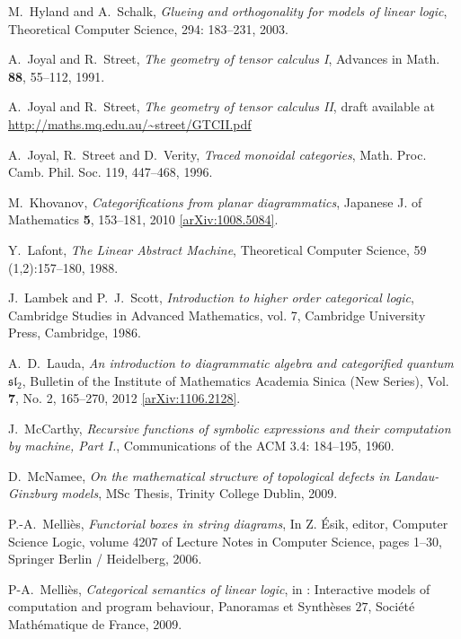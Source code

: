 \documentclass[english,letter paper,12pt,reqno]{article}
\theoremstyle{example}
\numberwithin{equation}{section}
\begin{document}
\begin{thebibliography}{BHLS03}
M.~Hyland and A.~Schalk, \textsl{Glueing and orthogonality for models of linear logic}, Theoretical Computer Science, 294: 183--231, 2003.

A.~Joyal and R.~Street, \textsl{The geometry of tensor calculus I}, Advances in Math. \textbf{88}, 55--112, 1991.

A.~Joyal and R.~Street, \textsl{The geometry of tensor calculus II}, 
draft available at 
\href{http://maths.mq.edu.au/~street/GTCII.pdf}{http://maths.mq.edu.au/\textasciitilde street/GTCII.pdf}

A.~Joyal, R.~Street and D.~Verity, \textsl{Traced monoidal categories}, Math. Proc. Camb. Phil. Soc. 119, 447--468, 1996.

M.~Khovanov, \textsl{Categorifications from planar diagrammatics}, Japanese J. of Mathematics \textbf{5}, 153--181, 2010 \href{http://arxiv.org/abs/1008.5084}{[arXiv:1008.5084]}.
  
Y.~Lafont, \textsl{The {L}inear {A}bstract {M}achine}, Theoretical Computer Science, 59 (1,2):157--180, 1988.

J.~Lambek and P.~J.~Scott, \textsl{Introduction to higher order categorical logic}, Cambridge Studies in Advanced Mathematics, vol. 7, Cambridge University Press, Cambridge, 1986.

A.~D.~Lauda, \textsl{An introduction to diagrammatic algebra and categorified quantum $\mathfrak{sl}_2$}, Bulletin of the Institute of Mathematics Academia Sinica (New Series), Vol. \textbf{7}, No. 2, 165--270, 2012 \href{http://arxiv.org/abs/1106.2128}{[arXiv:1106.2128]}.

J.~McCarthy, \textsl{Recursive functions of symbolic expressions and their computation by machine, Part I.}, Communications of the ACM 3.4: 184--195, 1960.

D.~McNamee, \textsl{On the mathematical structure of topological defects in
  {L}andau-{G}inzburg models}, MSc Thesis, Trinity College Dublin, 2009.
  
P.-A.~Melli\`{e}s, \textsl{Functorial boxes in string diagrams}, In Z. \'{E}sik, editor, Computer Science Logic,
volume 4207 of Lecture Notes in Computer Science, pages 1--30, Springer Berlin / Heidelberg,
2006.

P-A.~Melli\`{e}s, \textsl{Categorical semantics of linear logic}, in : Interactive models of computation and program behaviour, Panoramas et Synth\`{e}ses $27$, Soci\'{e}t\'{e} Math\'{e}matique de France, 2009.


\end{thebibliography}
\end{document}
